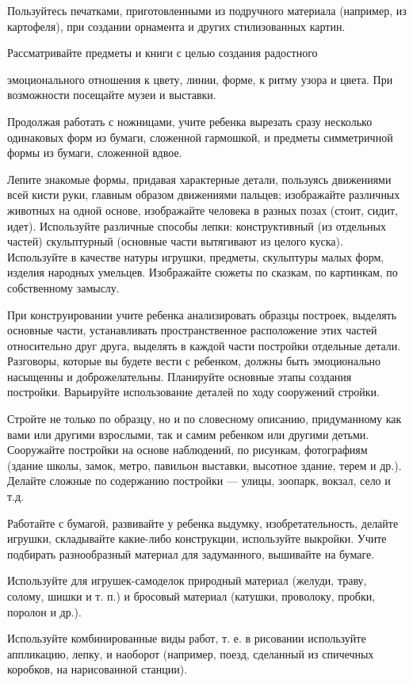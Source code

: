 \documentclass[a5paper]{book}
\begin{document}
Пользуйтесь печатками, приготовленными из подручного материала
(например, из картофеля), при создании орнамента и других стилизованных
картин.

Рассматривайте предметы и книги с целью создания радостного

эмоционального отношения к цвету, линии, форме, к ритму узора и цвета.
При возможности посещайте музеи и выставки.

Продолжая работать с ножницами, учите ребенка вырезать сразу несколько
одинаковых форм из бумаги, сложенной гармошкой, и предметы симметричной
формы из бумаги, сложенной вдвое.

Лепите знакомые формы, придавая характерные детали, пользуясь движениями
всей кисти руки, главным образом движениями пальцев; изображайте
различных животных на одной основе, изображайте человека в разных позах
(стоит, сидит, идет). Используйте различные способы лепки:
конструктивный (из отдельных частей) скульптурный (основные части
вытягивают из целого куска). Используйте в качестве натуры игрушки,
предметы, скульптуры малых форм, изделия народных умельцев. Изображайте
сюжеты по сказкам, по картинкам, по собственному замыслу.

При конструировании учите ребенка анализировать образцы построек,
выделять основные части, устанавливать пространственное расположение
этих частей относительно друг друга, выделять в каждой части постройки
отдельные детали. Разговоры, которые вы будете вести с ребенком, должны
быть эмоционально насыщенны и доброжелательны. Планируйте основные этапы
создания постройки. Варьируйте использование деталей по ходу сооружений
стройки.

Стройте не только по образцу, но и по словесному описанию, придуманному
как вами или другими взрослыми, так и самим ребенком или другими детьми.
Сооружайте постройки на основе наблюдений, по рисункам, фотографиям
(здание школы, замок, метро, павильон выставки, высотное здание, терем и
др.). Делайте сложные по содержанию постройки --- улицы, зоопарк,
вокзал, село и т.д.

Работайте с бумагой, развивайте у ребенка выдумку, изобретательность,
делайте игрушки, складывайте какие-либо конструкции, используйте
выкройки. Учите подбирать разнообразный материал для задуманного,
вышивайте на бумаге.

Используйте для игрушек-самоделок природный материал (желуди, траву,
солому, шишки и т. п.) и бросовый материал (катушки, проволоку, пробки,
поролон и др.).

Используйте комбинированные виды работ, т. е. в рисовании используйте
аппликацию, лепку, и наоборот (например, поезд, сделанный из спичечных
коробков, на нарисованной станции).
\end{document}
